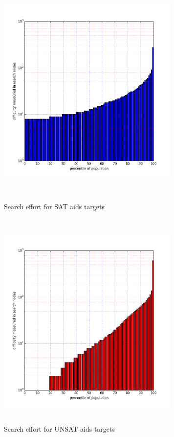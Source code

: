 \documentclass{l4proj}
\begin{document}
\begin{figure}[h]
\centering
\begin{minipage}[t]{.5\textwidth}
  \centering
  \includegraphics[height=11cm,width=9cm]{images/plots/aidsSAT.png}
  \caption{Search effort for SAT aids targets}
  \label{aids:SAT}
\end{minipage}%
\begin{minipage}[t]{.5\textwidth}
  \centering
  \includegraphics[height=11cm,width=9cm]{images/plots/aidsUNSAT.png}
  \caption{Search effort for UNSAT aids targets}
  \label{aids:UNSAT}
\end{minipage}
\end{figure}
\end{document}
